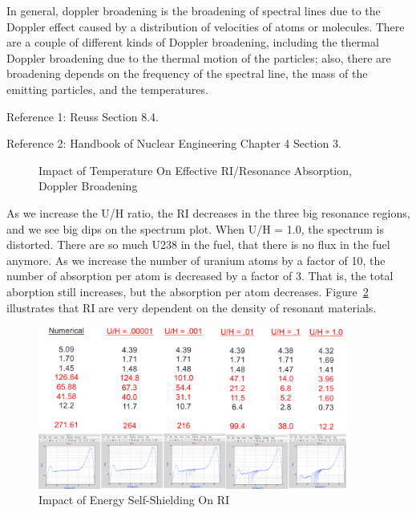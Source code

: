 \documentclass{school-22.211-notes}
\begin{document}
In general, doppler broadening is the broadening of spectral lines due to the Doppler effect caused by a distribution of velocities of atoms or molecules. There are a couple of different kinds of Doppler broadening, including the thermal Doppler broadening due to the thermal motion of the particles; also, there are broadening depends on the frequency of the spectral line, the mass of the emitting particles, and the temperatures. 

Reference 1: Reuss Section 8.4. 

Reference 2: Handbook of Nuclear Engineering Chapter 4 Section 3. 

\begin{figure}
  \centering
  \caption{Impact of Temperature On Effective RI/Resonance Absorption, Doppler Broadening} \label{Doppler}
\end{figure}


As we increase the U/H ratio, the RI decreases in the three big resonance regions, and we see big dips on the spectrum plot. When U/H = 1.0, the spectrum is distorted. There are so much U238 in the fuel, that there is no flux in the fuel anymore. As we increase the number of uranium atoms by a factor of 10, the number of absorption per atom is decreased by a factor of 3. That is, the total aborption still increases, but the absorption per atom decreases. Figure~\ref{self-shielding} illustrates that RI are very dependent on the density of resonant materials. 
\begin{figure}
  \centering
  \includegraphics[width=4in]{images/self-shielding.png}
  \caption{Impact of Energy Self-Shielding On RI} \label{self-shielding}
\end{figure}
\end{document}
